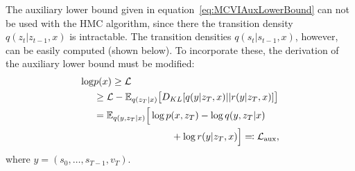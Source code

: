 The auxiliary lower bound given in equation~\eqref{eq:MCVIAuxLowerBound} can not be used with the HMC algorithm, since there the transition density $q(z_t|z_{t-1}, x)$ is intractable. The transition densities $q(s_t|s_{t-1}, x)$, however, can be easily computed (shown below). To incorporate these, the derivation of the auxiliary lower bound must be modified:\begin{equation}
\begin{split}
\log & p(x) \geq \mathcal{L} \\
& \geq \mathcal{L} - \mathbb{E}_{q(z_T|x)} \big[ D_{KL}[q(y | z_T, x) || r(y | z_T, x)] \big] \\
& = \mathbb{E}_{q(y, z_T|x)} \Big[ \log p(x, z_T) - \log q(y, z_T|x) \\
& 	\qquad\qquad\qquad\qquad 							+ \log r(y | z_T, x) \Big] \eqqcolon \mathcal{L}_{\textrm{aux}},
\end{split}
\end{equation}
where $y = (s_0, \dots, s_{T-1}, v_T)$.

